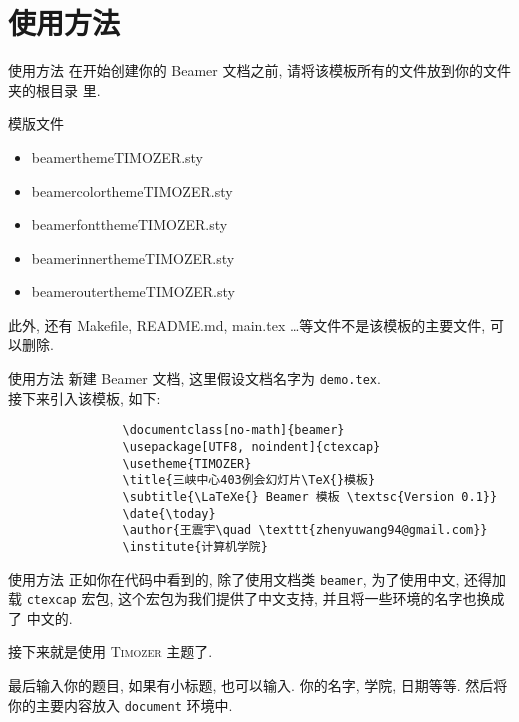 \documentclass[no-math]{beamer}
\begin{document}
    \section{使用方法}
        \begin{frame}{使用方法}
            在开始创建你的 Beamer 文档之前, 请将该模板所有的文件放到你的文件夹的根目录
            里.
            \begin{block}{模版文件}
                \begin{itemize}
                    \item beamerthemeTIMOZER.sty
                    \item beamercolorthemeTIMOZER.sty
                    \item beamerfontthemeTIMOZER.sty
                    \item beamerinnerthemeTIMOZER.sty
                    \item beamerouterthemeTIMOZER.sty
                \end{itemize}
            \end{block}
            此外, 还有 Makefile, README.md, main.tex \ldots 等文件不是该模板的主要文件,
            可以删除.
        \end{frame}

        \begin{frame}[fragile]{使用方法}
            新建 Beamer 文档, 这里假设文档名字为 \texttt{demo.tex}.\\
            接下来引入该模板, 如下:
            \begin{verbatim}
                \documentclass[no-math]{beamer}
                \usepackage[UTF8, noindent]{ctexcap}
                \usetheme{TIMOZER}
                \title{三峡中心403例会幻灯片\TeX{}模板}
                \subtitle{\LaTeXe{} Beamer 模板 \textsc{Version 0.1}}
                \date{\today}
                \author{王震宇\quad \texttt{zhenyuwang94@gmail.com}}
                \institute{计算机学院}
            \end{verbatim}
        \end{frame}
        \begin{frame}{使用方法}
            正如你在代码中看到的, 除了使用文档类 \texttt{beamer}, 为了使用中文, 还得加载
            \texttt{ctexcap} 宏包, 这个宏包为我们提供了中文支持, 并且将一些环境的名字也换成了
            中文的.

            接下来就是使用 \textsc{Timozer} 主题了.

            最后输入你的题目, 如果有小标题, 也可以输入. 你的名字, 学院, 日期等等.
            然后将你的主要内容放入 \texttt{document} 环境中.
        
        \end{frame}
\end{document}
